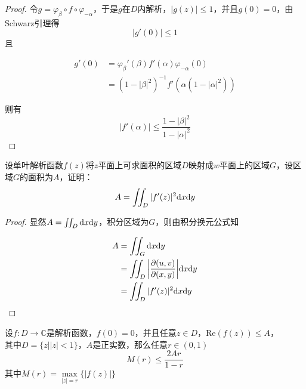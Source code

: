 \begin{proof}
    
    令$g = \varphi_{\beta}\circ f \circ \varphi_{-\alpha}$，于是$g$在$D$内解析，$|g(z)| \leq 1$，并且$g(0) = 0$，由\textup{Schwarz}引理得
    $$|g'(0)| \leq 1$$
    且
    
    \begin{align*}
        g'(0) & = \varphi_{\beta}'(\beta) f'(\alpha) \varphi_{-\alpha}(0)\\
        & =  (1 -|\beta|^2)^{-1}f'(\alpha (1 - |\alpha|^2))
    \end{align*}

    则有
    $$|f'(\alpha)| \leq \dfrac{1 - |\beta|^2}{1 - |\alpha|^2}$$

\end{proof}

\begin{proposition}
    
    设单叶解析函数$f(z)$将$z$平面上可求面积的区域$D$映射成$w$平面上的区域$G$，设区域$G$的面积为$A$，证明：
    $$ A = \iint_{D}{|f'(z)|^2}\mathrm{d} x\mathrm{d} y$$

\end{proposition}

\begin{proof}
    
    显然$A = \iint_{D}\mathrm{d} x\mathrm{d} y$，积分区域为$G$，则由积分换元公式知

    \begin{align*}
        A & = \iint_{G}\mathrm{d} x\mathrm{d} y \\
          & = \iint_{D}{\left|\dfrac{\partial(u,v)}{\partial(x,y)}\right|}\mathrm{d} x\mathrm{d} y \\
          & = \iint_{D}{|f'(z)|^2}\mathrm{d} x\mathrm{d} y
    \end{align*}

\end{proof}

\begin{proposition}
    
    设$f:D \to \mathbb{C}$是解析函数，$f(0) = 0$，并且任意$z \in D$，$\mathrm{Re}(f(z)) \leq A$，\\
    其中$D = \{z \big| |z| < 1\}$，$A$是正实数，那么任意$r \in (0,1)$
    $$M(r) \leq \dfrac{2Ar}{1 - r}$$
    其中$M(r) = \max\limits_{|z|=r}\{|f(z)|\}$

\end{proposition}

